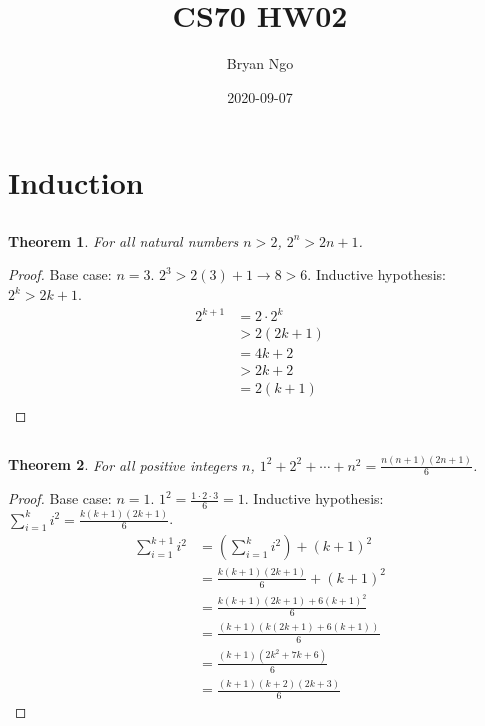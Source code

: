 \documentclass{article}
\title{CS70 HW02}
\author{Bryan Ngo}
\date{2020-09-07}
\newtheorem{theorem}{Theorem}
\begin{document}
\maketitle

\section{Induction}

\subsection{}

\begin{theorem}
    For all natural numbers \(n > 2\), \(2^n > 2n + 1\).
\end{theorem}
\begin{proof}
    Base case: \(n = 3\). \(2^3 > 2(3) + 1 \to 8 > 6\).
    Inductive hypothesis: \(2^k > 2k + 1\).
    \begin{align}
        2^{k + 1} &= 2 \cdot 2^k \\
        &> 2 (2k + 1) \\
        &= 4k + 2 \\
        &> 2k + 2 \\
        &= 2(k + 1) \\
    \end{align}
\end{proof}

\subsection{}

\begin{theorem}
    For all positive integers \(n\), \(1^2 + 2^2 + \cdots + n^2 = \frac{n (n + 1) (2n + 1)}{6}\).
\end{theorem}
\begin{proof}
    Base case: \(n = 1\). \(1^2 = \frac{1 \cdot 2 \cdot 3}{6} = 1\).
    Inductive hypothesis: \(\sum_{i = 1}^k i^2 = \frac{k (k + 1) (2k + 1)}{6}\).
    \begin{align}
        \sum_{i = 1}^{k + 1} i^2 &= \left(\sum_{i = 1}^k i^2\right) + (k + 1)^2 \\
        &= \frac{k (k + 1) (2k + 1)}{6} + (k + 1)^2 \\
        &= \frac{k (k + 1) (2k + 1) + 6(k + 1)^2}{6} \\
        &= \frac{(k + 1) (k (2k + 1) + 6(k + 1))}{6} \\
        &= \frac{(k + 1) (2k^2 + 7k + 6)}{6} \\
        &= \frac{(k + 1) (k + 2) (2k + 3)}{6}
    \end{align}
\end{proof}
\end{document}
